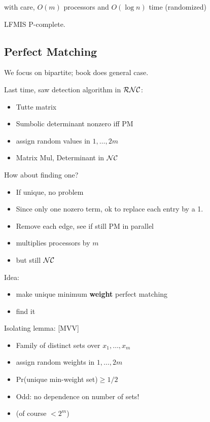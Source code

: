 \documentclass[12pt]{article}
\begin{document}
with care, $O(m)$ processors and $O(\log n)$ time (randomized)

LFMIS P-complete.


\subsection*{Perfect Matching}

We focus on bipartite; book does general case.


Last time, saw detection algorithm in $\cal{R}\cal{N}\cal{C}$:
\begin{itemize}
\item Tutte matrix
\item Sumbolic determinant nonzero iff PM
\item assign random values in $1,\ldots,2m$
\item Matrix Mul, Determinant in $\cal{N} \cal{C}$
\end{itemize}

How about finding one?
\begin{itemize}
\item If unique, no problem
\item Since only one nozero term, ok to replace each entry by a 1.
\item Remove each edge, see if still PM in parallel
\item multiplies processors by $m$
\item but still $\cal{N} \cal{C}$
\end{itemize}

Idea: 
\begin{itemize}
\item make unique minimum \textbf{weight} perfect matching
\item find it
\end{itemize}

Isolating lemma: [MVV]
\begin{itemize}
\item Family of distinct sets over $x_1,\ldots,x_m$
\item assign random weights in $1,\ldots,2m$
\item Pr(unique min-weight set)$\ge 1/2$
\item Odd: no dependence on number of sets! 
\item (of course $<2^m$)
\end{itemize}
\end{document}
